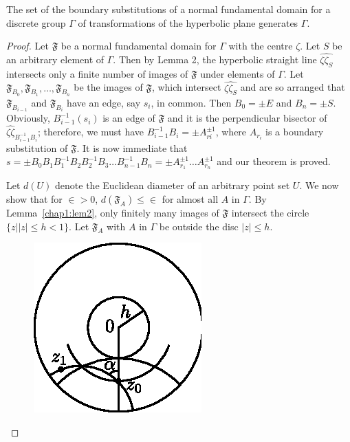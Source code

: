 \begin{thm}\label{chap1:thm5}
The set of the boundary substitutions of a normal fundamental domain
for a discrete group $\Gamma$ of transformations of the hyperbolic
plane generates $\Gamma$.
\end{thm}

\begin{proof}
Let $\mathfrak{F}$ be a normal fundamental domain for $\Gamma$ with
the centre $\zeta$. Let $S$ be an arbitrary element of $\Gamma$. Then
by Lemma 2, the hyperbolic straight line $\widehat{\zeta\zeta_S}$
intersects only a finite number of images of $\mathfrak{F}$ under
elements of $\Gamma$. Let $\mathfrak{F}_{B_0},\mathfrak{F}_{B_1},
\ldots, \mathfrak{F}_{B_n}$ be the images of $\mathfrak{F}$, which
intersect $\widehat{\zeta\zeta_S}$ and are so arranged that
$\mathfrak{F}_{B_{i-1}}$ and $\mathfrak{F}_{B_i}$ have an edge, say
$s_i$, in common. Then $B_0= \pm E$ and $B_n= \pm S$. Obviously,
$B^{-1}_{i-1}(s_i)$ is an edge of $\mathfrak{F}$ and it is the
perpendicular bisector of $\widehat{\zeta\zeta}_{B^{-1}_{i-1}B_i}$; therefore,
we must have $B^{-1}_{i-1}B_i = \pm A^{\pm 1}_{r i}$, where $A_{r_i}$
is a boundary substitution of $\mathfrak{F}$. It is now immediate that
$s=\pm B_0 B_1B^{-1}_1 B_2B^{-1}_2 B_3 \ldots B^{-1}_{n-1} B_n =\pm
A^{\pm 1}_{r_1} \ldots A^{\pm 1}_{r_n}$ and our theorem is proved. 

Let $d(U)$ denote the Euclidean diameter of an arbitrary point set
$U$. We now show that for $\in > 0$, $d(\mathfrak{F}_A)\leq
\in$ for almost all $A$ in $\Gamma$. By Lemma~\ref{chap1:lem2},
\pageoriginale only finitely many images of $\mathfrak{F}$ intersect
the circle $\{z||z|\leq h < 1\}$. Let $\mathfrak{F}_A$ with $A$ in
$\Gamma$ be outside the disc $|z|\leq h$.

\begin{figure}[H]
\centering
\includegraphics{vol29-fig/fig29-11.eps}
\smallskip
\caption{}
\label{chap1:fig11}
\end{figure}


\end{proof}
